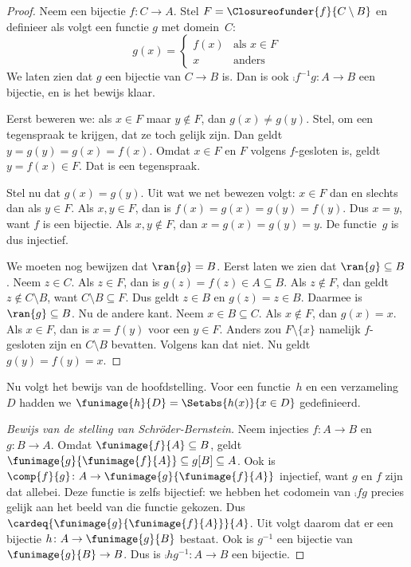 \documentclass[openany]{memoir}
\begin{document}
\begin{proof}
Neem een bijectie $f \colon C \to A$. Stel $F =
\Closureofunder{f}{C \setminus B}$ en definieer als volgt een functie
$g$ met domein~$C$:
\[
	g(x) =
	\begin{cases}
			f(x) &\text{als $x \in F$}\\
			x & \text{anders}
		\end{cases}
\]
We laten zien dat $g$ een bijectie van $C \to B$ is. Dan is ook
$\comp{f^{-1}}{g} \colon A \to B$ een bijectie, en is het bewijs
klaar.

Eerst beweren we: als $x \in F$ maar $y\notin F$, dan $g(x) \neq g(y)$.
Stel, om een tegenspraak te krijgen, dat ze toch gelijk zijn. Dan geldt
$y = g(y) = g(x) = f(x)$. Omdat $x \in F$ en $F$ volgens
 $f$-gesloten is, geldt $y = f(x) \in F$. Dat is
een tegenspraak.

Stel nu dat $g(x) = g(y)$. Uit wat we net bewezen volgt: $x \in F$ dan
en slechts dan als $y \in F$. Als $x, y \in F$, dan is $f(x) = g (x)
= g(y) = f(y)$. Dus $x = y$, want $f$ is een bijectie. Als
$x, y \notin F$, dan $x = g(x) = g(y) = y$. De functie~$g$ is dus
injectief.

We moeten nog bewijzen dat $\ran{g} = B$. Eerst laten we zien dat
$\ran{g} \subseteq B$. Neem $z \in C$. Als $z \in F$, dan is
$g(z) = f(z) \in A \subseteq B$. Als $z \notin F$, dan geldt
$z \notin C \setminus B$, want $C \setminus B \subseteq F$. Dus geldt
$z \in B$ en $g(z) = z \in B$. Daarmee is
$\ran{g} \subseteq B$. Nu de andere kant. Neem $x \in B \subseteq C$.
Als $x \notin F$, dan $g(x) = x$.
Als $x \in F$, dan is $x = f(y)$ voor een $y \in F$. Anders zou
$F \setminus \{x\}$ namelijk $f$-gesloten zijn en $C\setminus B$
bevatten. Volgens  kan dat niet. Nu geldt
$g(y) = f(y) = x$.
\end{proof}

Nu volgt het bewijs van de hoofdstelling. Voor een functie~$h$ en een
verzameling~$D$ hadden we $\funimage{h}{D} = \Setabs{h(x)}{x \in D}$
gedefinieerd.

\begin{proof}[Bewijs van de stelling van Schr\"oder-Bernstein] Neem
injecties $f \colon A \to B$ en $g \colon B \to A$. Omdat
$\funimage{f}{A} \subseteq B$, geldt
$\funimage{g}{\funimage{f}{A}} \subseteq g[B] \subseteq A$. Ook is
$\comp{f}{g} \colon A \to \funimage{g}{\funimage{f}{A}}$ injectief,
want $g$ en $f$ zijn dat allebei. Deze functie is zelfs bijectief: we
hebben het codomein van $\comp{f}{g}$ precies gelijk aan het beeld van
die functie gekozen. Dus
$\cardeq{\funimage{g}{\funimage{f}{A}}}{A}$. Uit
 volgt daarom dat er een bijectie $h \colon A \to
\funimage{g}{B}$ bestaat. Ook is $g^{-1}$ een bijectie van
$\funimage{g}{B} \to B$. Dus is $\comp{h}{g^{-1}} \colon A \to B$
een bijectie.
\end{proof}
\endgroup
\OLEndChapterHook
\OLEndPartHook
\end{document}
